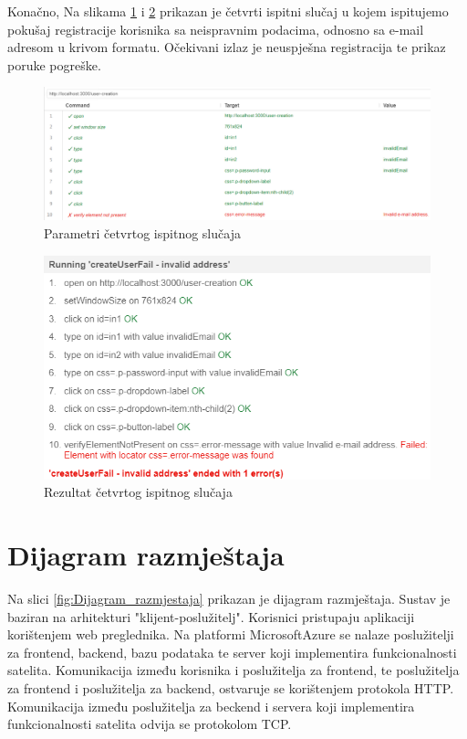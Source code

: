             Konačno, Na slikama \ref{fig:Params4} i \ref{fig:Result4} prikazan je četvrti ispitni slučaj u kojem ispitujemo pokušaj registracije korisnika sa neispravnim podacima, odnosno sa e-mail adresom u krivom formatu. Očekivani izlaz je neuspješna registracija te prikaz poruke pogreške.

                \begin{figure}[H]
                \centering
				\includegraphics[width=\linewidth]{slike/registerFailParams.png}
				\caption{Parametri četvrtog ispitnog slučaja }
				\label{fig:Params4}
			\end{figure}
   
                 \begin{figure}[H]
                 \centering
				\includegraphics[width=0.5\linewidth]{slike/registerFail.png}
				\caption{Rezultat četvrtog ispitnog slučaja}
				\label{fig:Result4}
			\end{figure}
			
			\eject 
			
		\section{Dijagram razmještaja}
			
			
			
			 Na slici \ref{fig:Dijagram_razmjestaja} prikazan je dijagram razmještaja. Sustav je baziran na arhitekturi "klijent-poslužitelj". Korisnici pristupaju aplikaciji korištenjem web preglednika. Na platformi MicrosoftAzure se nalaze poslužitelji za frontend, backend, bazu podataka te server koji implementira funkcionalnosti satelita. Komunikacija između korisnika i poslužitelja za frontend, te poslužitelja za frontend i poslužitelja za backend, ostvaruje se korištenjem protokola HTTP. Komunikacija između poslužitelja za beckend i servera koji implementira funkcionalnosti satelita odvija se protokolom TCP.
			
